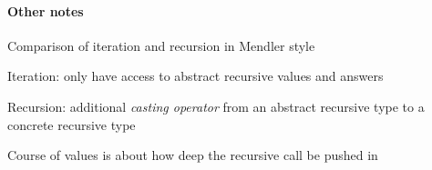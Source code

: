 \documentclass[a4paper,12pt]{book}
\begin{document}
\paragraph{Other notes}

Comparison of iteration and recursion in Mendler style

Iteration: only have access to abstract recursive values and answers

Recursion: additional \emph{casting operator} from an abstract recursive type
to a concrete recursive type

Course of values is about how deep the recursive call be pushed in



\end{document}
